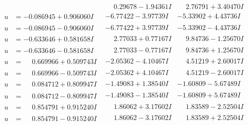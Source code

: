 \documentclass[1p]{elsarticle_modified}
\theoremstyle{definition}
\begin{document}
$$\begin{array}{c|c|c}
 & \phantom{-}0.29678 - 1.94361 I & \phantom{-}2.76791 + 3.40470 I \\ \hline\begin{aligned}
u &= -0.086945 + 0.906060 I\end{aligned}
 & -6.77422 - 3.97739 I & -5.33902 + 4.43736 I \\ \hline\begin{aligned}
u &= -0.086945 - 0.906060 I\end{aligned}
 & -6.77422 + 3.97739 I & -5.33902 - 4.43736 I \\ \hline\begin{aligned}
u &= -0.633646 + 0.581658 I\end{aligned}
 & \phantom{-}2.77033 + 0.77167 I & \phantom{-}9.84736 - 1.25670 I \\ \hline\begin{aligned}
u &= -0.633646 - 0.581658 I\end{aligned}
 & \phantom{-}2.77033 - 0.77167 I & \phantom{-}9.84736 + 1.25670 I \\ \hline\begin{aligned}
u &= \phantom{-}0.669966 + 0.509743 I\end{aligned}
 & -2.05362 - 4.10467 I & \phantom{-}4.51219 + 2.60017 I \\ \hline\begin{aligned}
u &= \phantom{-}0.669966 - 0.509743 I\end{aligned}
 & -2.05362 + 4.10467 I & \phantom{-}4.51219 - 2.60017 I \\ \hline\begin{aligned}
u &= \phantom{-}0.084712 + 0.809947 I\end{aligned}
 & -1.49083 + 1.38540 I & -1.60809 - 5.67489 I \\ \hline\begin{aligned}
u &= \phantom{-}0.084712 - 0.809947 I\end{aligned}
 & -1.49083 - 1.38540 I & -1.60809 + 5.67489 I \\ \hline\begin{aligned}
u &= \phantom{-}0.854791 + 0.915240 I\end{aligned}
 & \phantom{-}1.86062 + 3.17602 I & \phantom{-}1.83589 - 2.52504 I \\ \hline\begin{aligned}
u &= \phantom{-}0.854791 - 0.915240 I\end{aligned}
 & \phantom{-}1.86062 - 3.17602 I & \phantom{-}1.83589 + 2.52504 I \\ \hline\begin{aligned}

\end{aligned}
\end{array}$$
\end{document}
